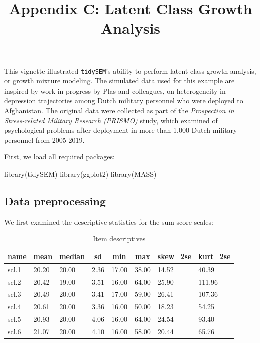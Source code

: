 \documentclass[
  man,floatsintext]{apa6}
\title{Appendix C: Latent Class Growth Analysis}
\author{\phantom{0}}
\date{}
\affiliation{\phantom{0}}
\newenvironment{Shaded}{\begin{snugshade}}{\end{snugshade}}
\newcommand{\FunctionTok}[1]{\textcolor[rgb]{0.00,0.00,0.00}{#1}}
\newcommand{\NormalTok}[1]{#1}
\begin{document}
\maketitle

This vignette illustrated \texttt{tidySEM}'s ability to perform latent class growth analysis, or growth mixture modeling.
The simulated data used for this example are inspired by work in progress by Plas and colleagues,
on heterogeneity in depression trajectories among Dutch military personnel who were deployed to Afghanistan.
The original data were collected as part of the \emph{Prospection in Stress-related Military Research (PRISMO)} study,
which examined of psychological problems after deployment in more than 1,000 Dutch military personnel from 2005-2019.

First, we load all required packages:

\begin{Shaded}
\begin{Highlighting}[]
\FunctionTok{library}\NormalTok{(tidySEM)}
\FunctionTok{library}\NormalTok{(ggplot2)}
\FunctionTok{library}\NormalTok{(MASS)}
\end{Highlighting}
\end{Shaded}

\hypertarget{data-preprocessing}{%
\subsection{Data preprocessing}\label{data-preprocessing}}

We first examined the descriptive statistics for the sum score scales:

\begin{table}[tbp]

\begin{center}
\begin{threeparttable}

\caption{\label{tab:unnamed-chunk-2}Item descriptives}

\begin{tabular}{llllllll}
\toprule
name & \multicolumn{1}{c}{mean} & \multicolumn{1}{c}{median} & \multicolumn{1}{c}{sd} & \multicolumn{1}{c}{min} & \multicolumn{1}{c}{max} & \multicolumn{1}{c}{skew\_2se} & \multicolumn{1}{c}{kurt\_2se}\\
\midrule
scl.1 & 20.20 & 20.00 & 2.36 & 17.00 & 38.00 & 14.52 & 40.39\\
scl.2 & 20.42 & 19.00 & 3.51 & 16.00 & 64.00 & 25.90 & 111.96\\
scl.3 & 20.49 & 20.00 & 3.41 & 17.00 & 59.00 & 26.41 & 107.36\\
scl.4 & 20.61 & 20.00 & 3.36 & 16.00 & 50.00 & 18.23 & 54.25\\
scl.5 & 20.93 & 20.00 & 4.06 & 16.00 & 64.00 & 24.54 & 93.40\\
scl.6 & 21.07 & 20.00 & 4.10 & 16.00 & 58.00 & 20.44 & 65.76\\
\bottomrule
\end{tabular}

\end{threeparttable}
\end{center}

\end{table}
\end{document}
